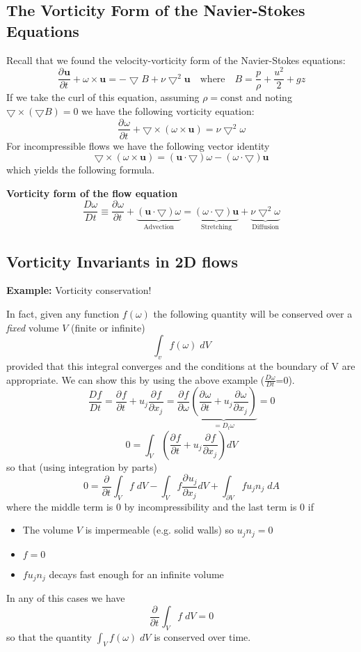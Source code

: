 \documentclass[11pt]{article}
\newcommand*{\pd}[3][]{\ensuremath{\frac{\partial^{#1} {#2}}{\partial {#3}^{#1}}}}
\newcommand*{\md}[1]{\ensuremath{\frac{D #1}{D t}}}
\newcommand{\grad}{\bigtriangledown}
\newcommand{\mv}[1]{\bm{#1}}
\newenvironment{eg}
{\begin{mdframed}[backgroundcolor=mylg, roundcorner=5pt, linewidth=0pt]\textbf{Example: }\normalfont}
    {\end{mdframed}}
\newenvironment{formula}
	{\begin{mdframed}[backgroundcolor=white, roundcorner=5pt, linewidth=1pt, linecolor=red]}
	{\end{mdframed}}
\begin{document}
\subsection{The Vorticity Form of the Navier-Stokes Equations}
Recall that we found the velocity-vorticity form of the Navier-Stokes equations:
$$\pd{\mv{u}}{t}+\omega\times\mv{u}=-\grad B+\nu\grad^2\mv{u}\quad\text{where}\quad B=\frac{p}{\rho}+\frac{u^2}{2}+gz$$
If we take the curl of this equation, assuming $\rho=\text{const}$ and noting $\grad\times(\grad B)=0$ we have the following vorticity equation:
$$\pd{\omega}{t}+\grad\times(\omega\times\mv{u})=\nu\grad^2\omega$$
For incompressible flows we have the following vector identity
$$\grad\times(\omega\times\mv{u})=(\mv{u}\cdot\grad)\omega-(\omega\cdot\grad)\mv{u}$$
which yields the following formula.
\begin{formula}
	\textbf{Vorticity form of the flow equation}
	$$\md{\omega}\equiv\pd{\omega}{t}+\underbrace{(\mv{u}\cdot\grad)\omega}_{\text{Advection}}=\underbrace{(\omega\cdot\grad)\mv{u}}_{\text{Stretching}}+\underbrace{\nu\grad^2\omega}_{\text{Diffusion}}$$
\end{formula}
\subsection{Vorticity Invariants in 2D flows}
\begin{eg}
Vorticity conservation!
\end{eg}
In fact, given any function $f(\omega)$ the following quantity will be conserved over a \emph{fixed} volume $V$ (finite or infinite)
$$\int_v f(\omega)\;dV$$
provided that this integral converges and the conditions at the boundary of V are appropriate. We can show this by using the above example ($\md{\omega}$=0).
$$\md{f}=\pd{f}{t}+u_j\pd{f}{x_j}=\pd{f}{\omega}\underbrace{\left(\pd{\omega}{t}+u_j\pd{\omega}{x_j}\right)}_{=D_t\omega}=0$$
$$0=\int_V\left(\pd{f}{t}+u_j\pd{f}{x_j}\right)dV$$
so that (using integration by parts)
$$0=\pd{}{t}\int_V f\;dV - \int_V f\pd{u_j}{x_j}dV+\int_{\partial V} fu_jn_j\;dA$$
where the middle term is $0$ by incompressibility and the last term is $0$ if
\begin{itemize}
	\item The volume $V$ is impermeable (e.g. solid walls) so $u_jn_j=0$
	\item $f=0$
	\item $fu_jn_j$ decays fast enough for an infinite volume
\end{itemize}
In any of this cases we have
$$\pd{}{t}\int_V f\;dV=0$$
so that the quantity $\int_V f(\omega)\;dV$ is conserved over time.
\end{document}
